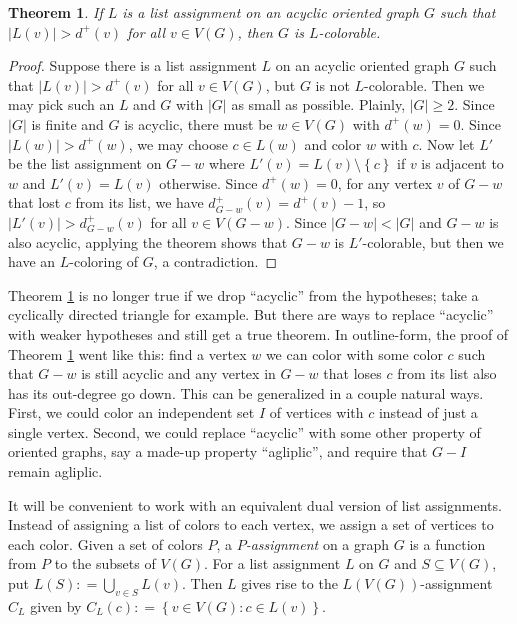 \documentclass[openany]{tufte-book} %
\theoremstyle{plain}
\newtheorem{theorem}{Theorem}
\newcommand{\set}[1]{\left\{ #1 \right\}}
\newcommand{\setb}[3]{\left\{ #1 \in #2 : #3 \right\}}
\newcommand{\card}[1]{\left|#1\right|}
\newcommand{\DefinedAs}{\mathrel{\mathop:}=}
\begin{document}
\begin{theorem}\label{SecondListBound}
If $L$ is a list assignment on an acyclic oriented graph $G$ such that $\card{L(v)} > d^+(v)$ for all $v \in V(G)$, then $G$ is $L$-colorable.
\end{theorem}
\begin{proof}
Suppose there is a list assignment $L$ on an acyclic oriented graph $G$ such that $\card{L(v)} > d^+(v)$ for all $v \in V(G)$, but $G$ is not $L$-colorable.  Then
we may pick such an $L$ and $G$ with $\card{G}$ as small as possible.  Plainly, $\card{G} \ge 2$. Since $\card{G}$ is finite and $G$ is acyclic, there must be $w \in V(G)$ with $d^+(w) = 0$.
Since $\card{L(w)} > d^+(w)$, we may choose $c \in L(w)$ and color $w$ with $c$.  Now let $L'$ be the list assignment on $G-w$ where $L'(v) = L(v) \setminus \set{c}$ if $v$
is adjacent to $w$ and $L'(v) = L(v)$ otherwise.  Since $d^+(w) = 0$, for any vertex $v$ of $G-w$ that lost $c$ from its list, we have $d_{G-w}^+(v) = d^+(v) - 1$, so 
$\card{L'(v)} > d_{G-w}^+(v)$ for all $v \in V(G-w)$.  Since $\card{G-w} < \card{G}$ and $G-w$ is also acyclic, applying the theorem shows that $G-w$ is $L'$-colorable, but then we have an $L$-coloring
of $G$, a contradiction.
\end{proof}

Theorem \ref{SecondListBound} is no longer true if we drop ``acyclic'' from the hypotheses; take a cyclically directed triangle for example.  
But there are ways to replace ``acyclic'' with weaker hypotheses and still get a true theorem.  In outline-form, the proof of Theorem \ref{SecondListBound} went like this: 
find a vertex $w$ we can color with some color $c$ such that $G-w$ is still acyclic and any vertex in $G-w$ that loses $c$ from its list also has its out-degree go down. 
This can be generalized in a couple natural ways.  First, we could color an independent set $I$ of vertices with $c$ instead of just a single vertex.  Second, we could replace ``acyclic'' with
some other property of oriented graphs, say a made-up property ``agliplic'', and require that $G-I$ remain agliplic.

It will be convenient to work with an equivalent dual version of list assignments.  
Instead of assigning a list of colors to each vertex, we assign a set of vertices to each color.  Given a set of colors $P$, a \emph{$P$-assignment} on a graph $G$ is a function
from $P$ to the subsets of $V(G)$.  For a list assignment $L$ on $G$ and $S \subseteq V(G)$, put $L(S) \DefinedAs \bigcup_{v \in S} L(v)$.
Then $L$ gives rise to the $L(V(G))$-assignment $C_L$ given by $C_L(c) \DefinedAs \setb{v}{V(G)}{c \in L(v)}$.
\end{document}
